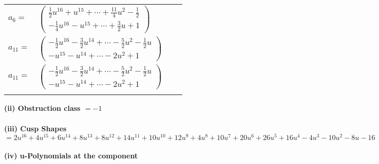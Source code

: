 \documentclass[1p]{elsarticle_modified}
\theoremstyle{definition}
\begin{document}
\begin{tabular}{m{7pt} m{180pt} m{7pt} m{180pt} }
\flushright $a_{6}=$&$\begin{pmatrix}\frac{1}{2} u^{16}+u^{15}+\cdots+\frac{11}{4} u^2-\frac{1}{2}\\-\frac{1}{4} u^{16}- u^{15}+\cdots+\frac{3}{2} u+1\end{pmatrix}$ \\
\flushright $a_{11}=$&$\begin{pmatrix}-\frac{1}{2} u^{16}-\frac{3}{2} u^{14}+\cdots-\frac{5}{2} u^2-\frac{1}{2} u\\- u^{15}- u^{14}+\cdots-2 u^2+1\end{pmatrix}$\\ \flushright $a_{11}=$&$\begin{pmatrix}-\frac{1}{2} u^{16}-\frac{3}{2} u^{14}+\cdots-\frac{5}{2} u^2-\frac{1}{2} u\\- u^{15}- u^{14}+\cdots-2 u^2+1\end{pmatrix}$\\&\end{tabular}
\flushleft \textbf{(ii) Obstruction class $= -1$}\\~\\
\flushleft \textbf{(iii) Cusp Shapes $= 2 u^{16}+4 u^{15}+6 u^{14}+8 u^{13}+8 u^{12}+14 u^{11}+10 u^{10}+12 u^9+4 u^8+10 u^7+20 u^6+26 u^5+16 u^4-4 u^3-10 u^2-8 u-16$}\\~\\
\newpage\renewcommand{\arraystretch}{1}
\flushleft \textbf{(iv) u-Polynomials at the component}\newline \\
\end{document}
